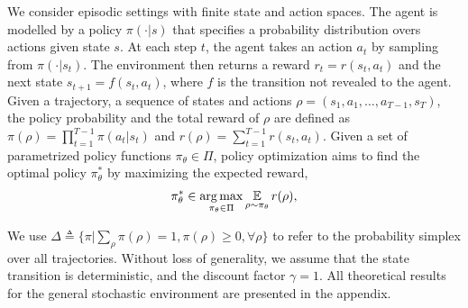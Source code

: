 We consider episodic
settings with finite state and action spaces. 
The agent is modelled by a policy $\pi( \cdot |s)$
that specifies a probability distribution overs actions
given state $s$. 
At each step $t$, the agent takes an action $a_t$ by sampling from
$\pi( \cdot | s_t)$.
The environment then returns a reward $r_t = r(s_t, a_t)$ and the next state
$s_{t+1} = f(s_t, a_t)$,
where $f$ is the transition not revealed to the agent.
Given a trajectory, a sequence of states and actions
$\rho=(s_1, a_1, \dots, a_{T-1}, s_T)$,
the policy probability and the total reward of $\rho$ are defined as
$\pi(\rho) = \prod_{t=1}^{T-1} \pi(a_t| s_t)$
 and $r(\rho) = \sum_{t=1}^{T-1} r(s_t, a_t)$. 
Given a set of parametrized policy functions $\pi_\theta \in \Pi$,
policy optimization aims to find the optimal policy $\pi_\theta^*$
by maximizing the expected reward,
\begin{equation}
\label{max_expected_reward}
\begin{split}
\pi_\theta^* \in \operatorname*{arg\,max}_{\pi_\theta \in \Pi}{ \operatorname*{\mathbb{E}}\limits_{\rho \sim \pi_\theta}{r(\rho)} },
\end{split}
\end{equation}

We use
$\Delta \triangleq \{ \pi | \sum_{\rho}{\pi(\rho)} = 1, \pi(\rho) \ge 0,
\forall \rho \}$
to refer to the probability simplex over all trajectories. 
Without loss of generality, we assume that the state transition
is deterministic, and the discount factor $\gamma = 1$.
All theoretical results for the general stochastic environment are presented
in the appendix. %
